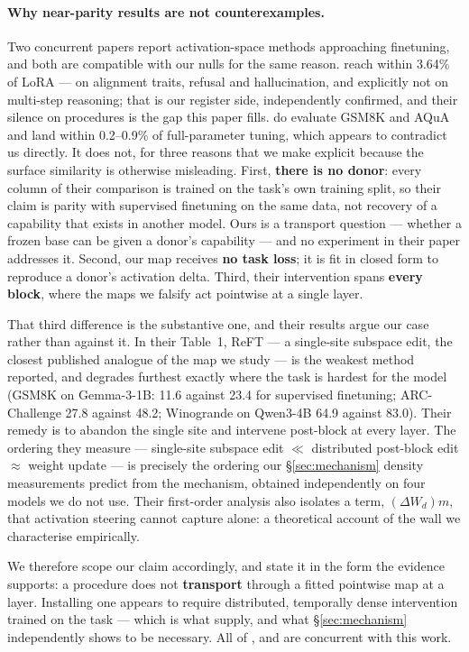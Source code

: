 \documentclass{article}
\begin{document}
\paragraph{Why near-parity results are not counterexamples.}
Two concurrent papers report activation-space methods approaching finetuning, and both are
compatible with our nulls for the same reason. \citet{nguyen2026innsteer} reach within 3.64\% of
LoRA --- on alignment traits, refusal and hallucination, and explicitly not on multi-step
reasoning; that is our register side, independently confirmed, and their silence on procedures is
the gap this paper fills. \citet{adila2026weightshifts} do evaluate GSM8K and AQuA and land within
0.2--0.9\% of full-parameter tuning, which appears to contradict us directly. It does not, for
three reasons that we make explicit because the surface similarity is otherwise misleading. First,
\textbf{there is no donor}: every column of their comparison is trained on the task's own training
split, so their claim is parity with supervised finetuning on the same data, not recovery of a
capability that exists in another model. Ours is a transport question --- whether a frozen base can
be given a donor's capability --- and no experiment in their paper addresses it. Second, our map
receives \textbf{no task loss}; it is fit in closed form to reproduce a donor's activation delta.
Third, their intervention spans \textbf{every block}, where the maps we falsify act pointwise at a
single layer.

That third difference is the substantive one, and their results argue our case rather than against
it. In their Table~1, ReFT --- a single-site subspace edit, the closest published analogue of the
map we study --- is the weakest method reported, and degrades furthest exactly where the task is
hardest for the model (GSM8K on Gemma-3-1B: 11.6 against 23.4 for supervised finetuning;
ARC-Challenge 27.8 against 48.2; Winogrande on Qwen3-4B 64.9 against 83.0). Their remedy is to
abandon the single site and intervene post-block at every layer. The ordering they measure ---
single-site subspace edit $\ll$ distributed post-block edit $\approx$ weight update --- is
precisely the ordering our \S\ref{sec:mechanism} density measurements predict from the mechanism,
obtained independently on four models we do not use. Their first-order analysis also isolates a
term, $(\Delta W_d)m$, that activation steering cannot capture alone: a theoretical account of the
wall we characterise empirically.

We therefore scope our claim accordingly, and state it in the form the evidence supports: a
procedure does not \textbf{transport} through a fitted pointwise map at a layer. Installing one
appears to require distributed, temporally dense intervention trained on the task --- which is what
\citet{adila2026weightshifts} supply, and what \S\ref{sec:mechanism} independently shows to be
necessary. All of \citet{adila2026weightshifts}, \citet{hsu2026clas} and \citet{nguyen2026innsteer}
are concurrent with this work.
\end{document}
